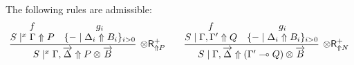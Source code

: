 \documentclass[runningheads]{llncs}
\renewcommand{\vec}{\overrightarrow}
\newcommand{\tr}{\otimes \mathsf{R}}
\newcommand{\ot}{\otimes}
\newcommand{\lolli}{\multimap}
\newcommand{\up}{\Uparrow}
\begin{document}
\begin{lemma}\label{lem:otR}
  The following rules are admissible:
  \[
  \infer[\tr_{\up P}^+]{S \mid^x \Gamma , \vec{\Delta} \up P \ot \vec{B}}{
      \deduce{S \mid^x \Gamma \up P}{f}
      &
      \deduce{\{ - \mid \Delta_i \up B_i\}_{i>0}}{g_i}
  }
  \qquad
  \infer[\tr_{\up N}^+]{S \mid \Gamma , \vec{\Delta} \up (\Gamma' \lolli Q) \ot \vec{B}}{
      \deduce{S \mid \Gamma,\Gamma' \up Q}{f}
      &
      \deduce{\{ - \mid \Delta_i \up B_i\}_{i>0}}{g_i}
  }
  \]
\end{lemma}
\end{document}
